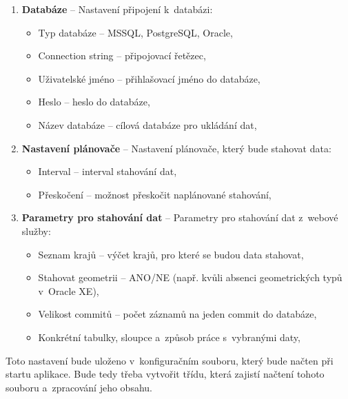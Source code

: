 \begin{enumerate}
    \item \textbf{Databáze} -- Nastavení připojení k~databázi:
    \begin{itemize}
        \item Typ databáze -- MSSQL, PostgreSQL, Oracle,
        \item Connection string -- připojovací řetězec,
        \item Uživatelské jméno -- přihlašovací jméno do databáze,
        \item Heslo -- heslo do databáze,
        \item Název databáze -- cílová databáze pro ukládání dat,
    \end{itemize}

    \item \textbf{Nastavení plánovače} -- Nastavení plánovače, který bude stahovat data:
    \begin{itemize}
        \item Interval -- interval stahování dat,
        \item Přeskočení -- možnost přeskočit naplánované stahování,
    \end{itemize}
    
    \item \textbf{Parametry pro stahování dat} -- Parametry pro stahování dat z~webové služby:
    \begin{itemize}
        \item Seznam krajů -- výčet krajů, pro které se budou data stahovat,
        \item Stahovat geometrii -- ANO/NE (např. kvůli absenci geometrických typů v~Oracle XE),
        \item Velikost commitů -- počet záznamů na jeden commit do databáze,
        \item Konkrétní tabulky, sloupce a~způsob práce s~vybranými daty,
    \end{itemize}
\end{enumerate}

Toto nastavení bude uloženo v~konfiguračním souboru, který bude načten při startu aplikace.
Bude tedy třeba vytvořit třídu, která zajistí načtení tohoto souboru a~zpracování jeho obsahu.